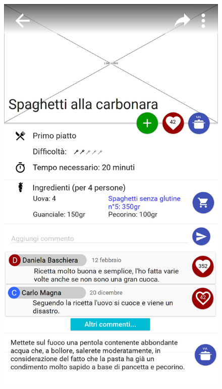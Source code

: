 \begin{figure}[H]
\begin{minipage}{.49\textwidth}
		\includegraphics[width=\textwidth]{img/wireframe/presentazione_ricetta_ingrediente_cambiato_aggiungi_ricetta.png}
	\end{minipage}
\end{figure}
